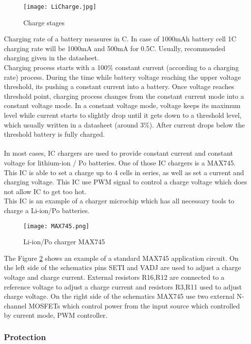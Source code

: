 \begin{figure}[h]
	\centering
	\texttt{[image: LiCharge.jpg]}
	\caption{ Charge stages \cite{14}}
	\label{fig: EPS}
\end{figure}
 Charging rate of a battery measures in C. In case of 1000mAh battery cell 1C charging rate will be 1000mA and 500mA for 0.5C. Usually, recommended charging given in the datasheet.\\
 Charging process starts with a 100\%  constant current (according to a charging rate) process. During the time while battery voltage reaching the upper voltage threshold, its pushing a constant current into a battery. Once voltage reaches threshold point, charging process changes from the constant current mode into a constant voltage mode. In a constant voltage mode, voltage keeps its maximum level while current starts to slightly drop until it gets down to a threshold level, which usually written in a datasheet (around 3\%). After current drops below the threshold battery is fully charged. \\ \\
 In most cases, IC chargers are used to provide constant current and constant voltage for lithium-ion / Po batteries. \cite{14} One of those IC chargers is a MAX745. 
This IC is able to set a charge up to 4 cells in series, as well as set a current and charging voltage. This IC use PWM signal to control a charge voltage which does not allow IC to get too hot.\\ This IC is an example of a charger microchip which has all necessary  tools to charge a Li-ion/Po batteries. 



\begin{figure}[h]
	\centering
	\texttt{[image: MAX745.png]}
	\caption{ Li-ion/Po charger MAX745 \cite{15}}
	\label{fig: EPS22}
\end{figure}

The Figure \ref{fig: EPS22} shows an example of a standard MAX745 application circuit. On the left side of the schematics pins SETI and VADJ are used to adjust a charge voltage and charge current. External resistors R16,R12 are connected to a reference voltage to adjust a charge current and resistors R3,R11  used to adjust charge voltage. On the right side of the schematics MAX745 use two external N-channel MOSFETs which control power from the input source which controlled by current mode, PWM controller. 



\subsubsection{Protection}

